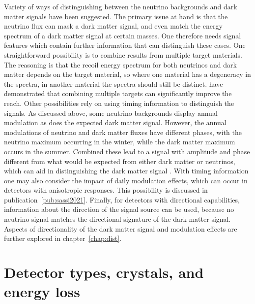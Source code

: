 \documentclass[b5paper, 10pt, twoside]{book}
\begin{document}
Variety of ways of distinguishing between the neutrino backgrounds and dark matter signals have been suggested. The primary issue at hand is that the neutrino flux can mask a dark matter signal, and even match the energy spectrum of a dark matter signal at certain masses. One therefore needs signal features which contain further information that can distinguish these cases. One straightforward possibility is to combine results from multiple target materials. The reasoning is that the recoil energy spectrum for both neutrinos and dark matter depends on the target material, so where one material has a degeneracy in the spectra, in another material the spectra should still be distinct. \textcite{BillardFigueroaFelicianoStrigari2014} have demonstrated that combining multiple targets can significantly improve the reach. Other possibilities rely on using timing information to distinguish the signals. As discussed above, some neutrino backgrounds display annual modulation as does the expected dark matter signal. However, the annual modulations of neutrino and dark matter fluxes have different phases, with the neutrino maximum occurring in the winter, while the dark matter maximum occurs in the summer. Combined these lead to a signal with amplitude and phase different from what would be expected from either dark matter or neutrinos, which can aid in distinguishing the dark matter signal \parencite{Davis2015}. With timing information one may also consider the impact of daily modulation effects, which can occur in detectors with anisotropic responses. This possibility is discussed in publication~\ref{pub:sassi2021}. Finally, for detectors with directional capabilities, information about the direction of the signal source can be used, because no neutrino signal matches the directional signature of the dark matter signal. Aspects of directionality of the dark matter signal and modulation effects are further explored in chapter~\ref{chap:dist}.

\chapter{Detector types, crystals, and energy loss}
\label{chap:energy-loss}
\end{document}
